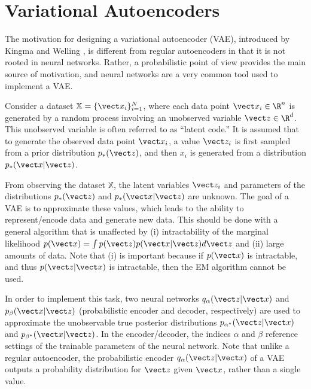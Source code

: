 \section{Variational Autoencoders}


The motivation for designing a variational autoencoder (VAE), introduced by Kingma and Welling \cite{kingma2014}, is different from regular autoencoders in that it is not rooted in neural networks. Rather, a probabilistic point of view provides the main source of motivation, and neural networks are a very common tool used to implement a VAE.

Consider a dataset $\mathbb{X} = \{\vect x_i\}_{i=1}^N$, where each data point $\vect x_i \in \R^n$ is generated by a random process involving an unobserved variable $\vect z \in \R^d$. This unobserved variable is often referred to as ``latent code.'' It is assumed that to generate the observed data point $\vect x_i$, a value $\vect z_i$ is first sampled from a prior distribution $p_*(\vect z)$, and then $x_i$ is generated from a distribution $p_*(\vect x | \vect z)$.

From observing the dataset $\mathbb{X}$, the latent variables $\vect z_i$ and parameters of the distributions $p_*(\vect z)$ and $p_*(\vect x | \vect z)$ are unknown. The goal of a VAE is to approximate these values, which leads to the ability to represent/encode data and generate new data. This should be done with a general algorithm that is unaffected by (i) intractability of the marginal likelihood $p(\vect x) = \int p(\vect z) p(\vect x | \vect z) d\vect z$ and (ii) large amounts of data.  Note that (i) is important because if $p(\vect x)$ is intractable, and thus $p(\vect z | \vect x)$ is intractable, then the EM algorithm cannot be used.

In order to implement this task, two neural networks $q_\alpha(\vect z | \vect x)$ and $p_\beta(\vect x | \vect z)$ (probabilistic encoder and decoder, respectively) are used to approximate the unobservable true posterior distributions $p_{\alpha^*}(\vect z| \vect x)$ and $p_{\beta^*}(\vect x | \vect z)$. In the encoder/decoder, the indices $\alpha$ and $\beta$ reference settings of the trainable parameters of the neural network. Note that unlike a regular autoencoder, the probabilistic encoder $q_\alpha(\vect z | \vect x)$ of a VAE outputs a probability distribution for $\vect z$ given $\vect x$, rather than a single value.

